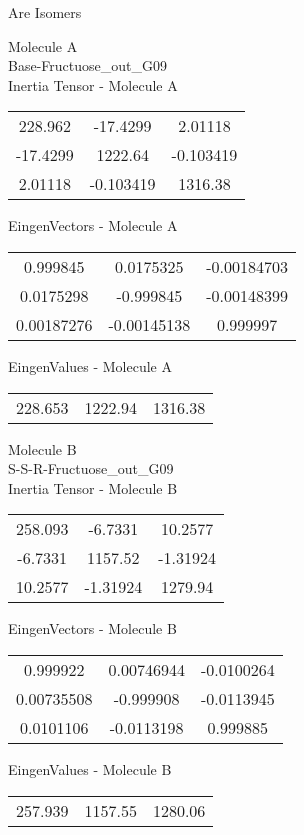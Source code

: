 \begin{center}
\vtab
\vtab
\textcolor{NavyBlue}{\Large Are Isomers}
\end{center}
\newpage
\begin{multicols}{2}
\begin{center}
Molecule A \\ 
Base-Fructuose\_out\_G09
\\
Inertia Tensor - Molecule A \\
\vtab
\begin{tabular}{|c c c|}
228.962	 & 	-17.4299	 & 	2.01118	 \\
-17.4299	 & 	1222.64	 & 	-0.103419	 \\
2.01118	 & 	-0.103419	 & 	1316.38
\end{tabular}

\vtab
 EingenVectors - Molecule A     \\
\vtab
\begin{tabular}{|c c c|}
0.999845	 & 	0.0175325	 & 	-0.00184703	 \\
0.0175298	 & 	-0.999845	 & 	-0.00148399	 \\
0.00187276	 & 	-0.00145138	 & 	0.999997
\end{tabular}

\vtab
 EingenValues - Molecule A     \\
\vtab
\begin{tabular}{|c c c|}
228.653	 & 	1222.94	 & 	1316.38
\end{tabular}
\columnbreak

Molecule B \\ 
S-S-R-Fructuose\_out\_G09
\\
Inertia Tensor - Molecule B \\
\vtab
\begin{tabular}{|c c c|}
258.093	 & 	-6.7331	 & 	10.2577	 \\
-6.7331	 & 	1157.52	 & 	-1.31924	 \\
10.2577	 & 	-1.31924	 & 	1279.94
\end{tabular}

\vtab
 EingenVectors - Molecule B     \\
\vtab
\begin{tabular}{|c c c|}
0.999922	 & 	0.00746944	 & 	-0.0100264	 \\
0.00735508	 & 	-0.999908	 & 	-0.0113945	 \\
0.0101106	 & 	-0.0113198	 & 	0.999885
\end{tabular}

\vtab
 EingenValues - Molecule B     \\
\vtab
\begin{tabular}{|c c c|}
257.939	 & 	1157.55	 & 	1280.06
\end{tabular}

\end{center}
\end{multicols}
